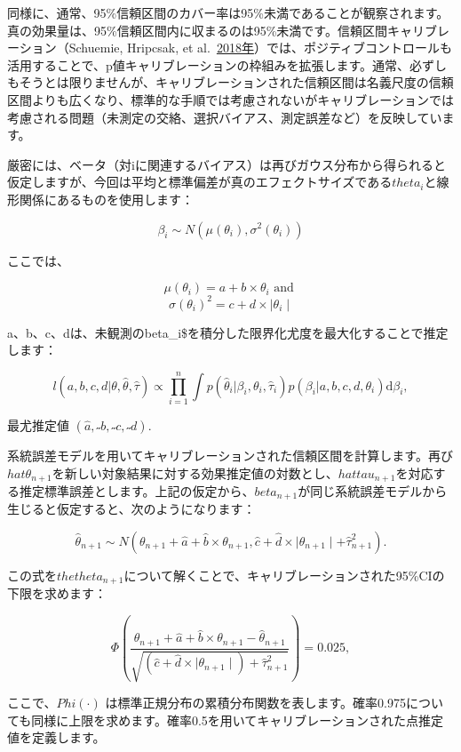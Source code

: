 \documentclass[
  11pt]{book}
\theoremstyle{definition}
\theoremstyle{definition}
\theoremstyle{definition}
\theoremstyle{definition}
\theoremstyle{remark}
\begin{document}

同様に、通常、95\%信頼区間のカバー率は95\%未満であることが観察されます。真の効果量は、95\%信頼区間内に収まるのは95\%未満です。信頼区間キャリブレーション（Schuemie, Hripcsak, et al.~\href{https://ohdsi.github.io/TheBookOfOhdsi/MethodValidity.html\#ref-schuemie_2018}{2018年}）では、ポジティブコントロールも活用することで、p値キャリブレーションの枠組みを拡張します。通常、必ずしもそうとは限りませんが、キャリブレーションされた信頼区間は名義尺度の信頼区間よりも広くなり、標準的な手順では考慮されないがキャリブレーションでは考慮される問題（未測定の交絡、選択バイアス、測定誤差など）を反映しています。

厳密には、ベータ（対iに関連するバイアス）は再びガウス分布から得られると仮定しますが、今回は平均と標準偏差が真のエフェクトサイズである\(theta_i\)と線形関係にあるものを使用します：

\[\beta_i \sim N(\mu(\theta_i) , \sigma^2(\theta_i))\]

ここでは、

\[\mu(\theta_i) = a + b \times \theta_i \text{ and }\] \[\sigma(\theta_i) ^2= c + d \times \mid \theta_i \mid\]

a\(、\)b\(、\)c\(、\)d\(は、未観測の\)beta\_i\$を積分した限界化尤度を最大化することで推定します：

\[l(a,b,c,d | \theta, \hat{\theta}, \hat{\tau} ) \propto \prod_{i=1}^{n}\int p(\hat{\theta}_i|\beta_i, \theta_i, \hat{\tau}_i)p(\beta_i|a,b,c,d,\theta_i) \text{d}\beta_i ,\]

最尤推定値 \((\hat{a}, ˶{b}, ˶{c}, ˶{d})\).

系統誤差モデルを用いてキャリブレーションされた信頼区間を計算します。再び\(hat{θ}_{n+1}\)を新しい対象結果に対する効果推定値の対数とし、\(hat{tau}_{n+1}\)を対応する推定標準誤差とします。上記の仮定から、\(beta_{n+1}\)が同じ系統誤差モデルから生じると仮定すると、次のようになります：

\[\hat{\theta}_{n+1} \sim N(
\theta_{n+1} + \hat{a} + \hat{b} \times \theta_{n+1},
\hat{c} + \hat{d} \times \mid \theta_{n+1} \mid + \hat{\tau}_{n+1}^2) .\]

この式を\(thetheta_{n+1}\)について解くことで、キャリブレーションされた95\%CIの下限を求めます：

\[\Phi\left(
\frac{\theta_{n+1} + \hat{a} + \hat{b} \times \theta_{n+1}-\hat{\theta}_{n+1}}
{\sqrt{(\hat{c} + \hat{d} \times \mid \theta_{n+1} \mid) + \hat{\tau}_{n+1}^2}}
\right) = 0.025 ,\]

ここで、\(Phi( \cdot)\) は標準正規分布の累積分布関数を表します。確率0.975についても同様に上限を求めます。確率0.5を用いてキャリブレーションされた点推定値を定義します。
\end{document}
